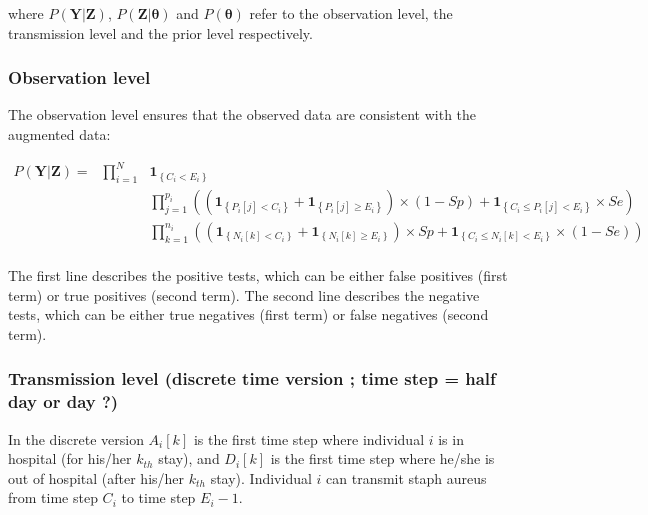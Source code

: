 \documentclass[10pt]{article}
\begin{document}
\noindent where $P\left(\bm{Y}|\bm{Z}\right)$, $P\left(\bm{Z}|\bm{\theta}\right)$ 
and $P\left(\bm{\theta}\right)$ refer to the observation level, the transmission level
 and the prior level respectively.


\subsubsection*{Observation level}


The observation level ensures that the observed data are consistent with the augmented data:

\begin{eqnarray*}
P\left(\bm{Y}|\bm{Z}\right) = &
\bm{\prod}_{i=1}^N & %
 \mathbf{1}_{\left\lbrace C_i < E_i \right\rbrace} \\
 &&
 \bm{\prod}_{j=1}^{p_i} %
\left(
\left( \mathbf{1}_{\left\lbrace P_i[j] < C_i \right\rbrace}+\mathbf{1}_{\left\lbrace P_i[j] \geq E_i \right\rbrace} \right) \times \left(1-Sp\right) %
+ \mathbf{1}_{\left\lbrace C_i \leq P_i[j] < E_i \right\rbrace} \times Se %
\right) \\ 
& & \bm{\prod}_{k=1}^{n_i} %
\left(
\left( \mathbf{1}_{\left\lbrace N_i[k] < C_i \right\rbrace}+\mathbf{1}_{\left\lbrace N_i[k] \geq E_i \right\rbrace} \right) \times Sp %
+ \mathbf{1}_{\left\lbrace C_i \leq N_i[k] < E_i \right\rbrace} \times \left(1-Se\right) %
\right) \\ 
\end{eqnarray*}

The first line describes the positive tests, which can be either false positives (first term) or true positives (second term). 
The second line describes the negative tests, which can be either true negatives (first term) or false negatives (second term). 


\subsubsection*{Transmission level (discrete time version ; time step = half day or day ?)} 


In the discrete version $A_i[k]$ is the first time step where individual $i$ is in hospital (for his/her $k_{th}$ stay), and $D_i[k]$ is the first time step where he/she is out of hospital (after his/her $k_{th}$ stay). Individual $i$ can transmit staph aureus from time step $C_i$ to time step $E_i-1$. 
\end{document}

